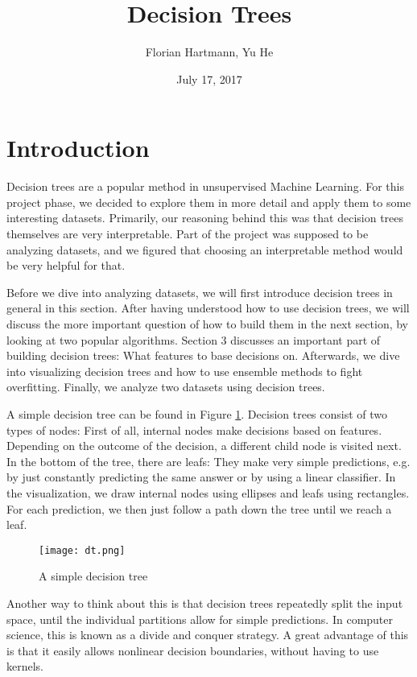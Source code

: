 \documentclass[a4paper]{article}
\title{Decision Trees}
\author{Florian Hartmann, Yu He}
\date{July 17, 2017}
\begin{document}
\maketitle

\section{Introduction}

Decision trees are a popular method in unsupervised Machine Learning. For this project phase, we decided to explore them in more detail and apply them to some interesting datasets. Primarily, our reasoning behind this was that decision trees themselves are very interpretable. Part of the project was supposed to be analyzing datasets, and we figured that choosing an interpretable method would be very helpful for that.

Before we dive into analyzing datasets, we will first introduce decision trees in general in this section. After having understood how to use decision trees, we will discuss the more important question of how to build them in the next section, by looking at two popular algorithms. Section 3 discusses an important part of building decision trees: What features to base decisions on. Afterwards, we dive into visualizing decision trees and how to use ensemble methods to fight overfitting. Finally, we analyze two datasets using decision trees.

A simple decision tree can be found in Figure \ref{fig:simple}. Decision trees consist of two types of nodes: First of all, internal nodes make decisions based on features. Depending on the outcome of the decision, a different child node is visited next. In the bottom of the tree, there are leafs: They make very simple predictions, e.g. by just constantly predicting the same answer or by using a linear classifier. In the visualization, we draw internal nodes using ellipses and leafs using rectangles. For each prediction, we then just follow a path down the tree until we reach a leaf.

\begin{figure}
	\centering
	\texttt{[image: dt.png]}
    \label{fig:simple}
    \caption{A simple decision tree}
\end{figure}

Another way to think about this is that decision trees repeatedly split the input space, until the individual partitions allow for simple predictions. In computer science, this is known as a divide and conquer strategy. A great advantage of this is that it easily allows nonlinear decision boundaries, without having to use kernels.
\end{document}
